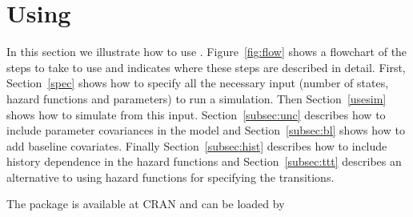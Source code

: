 %








\section[Using the package]{Using }\label{use}
In this section we illustrate how to use  \citep{pkg:gems}. Figure~\ref{fig:flow} shows a flowchart of the steps to take to use  and indicates where these steps are described in detail. First, Section~\ref{spec} shows how to specify all the necessary input (number of states, hazard functions and parameters) to run a simulation. Then Section~\ref{usesim} shows how to simulate from this input. Section~\ref{subsec:unc} describes how to include parameter covariances in the model and Section~\ref{subsec:bl} shows how to add baseline covariates. Finally Section~\ref{subsec:hist} describes how to include history dependence in the hazard functions and Section~\ref{subsec:ttt} describes an alternative to using hazard functions for specifying the transitions. 



The package is available at CRAN and can be loaded by

